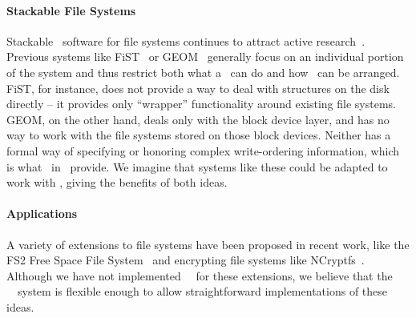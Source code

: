 
\paragraph{Stackable File Systems}


Stackable \module\ software for file systems continues to attract active
research~\cite{rosenthal90evolving, heidemann91layered, skinner93stacking,
heidemann94filesystem,zadok99extending,
zadok00fist,wright03ncryptfs,wright06versatility}. Previous
systems like FiST~\cite{zadok00fist} or GEOM~\cite{geom} generally focus on
an individual portion of the system and thus restrict both what a \module\
can do and how \modules\ can be arranged. FiST, for instance, does not
provide a way to deal with structures on the disk directly -- it provides
only ``wrapper'' functionality around existing file
systems. %
GEOM, on the other hand, deals only with the block device layer, and has no
way to work with the file systems stored on those block devices. Neither
has a formal way of specifying or honoring complex write-ordering
information, which is what \chdescs\ in \Kudos\ provide. We imagine that
systems like these could be adapted to work with \chdescs, giving the
benefits of both ideas.

\paragraph{Applications}

A variety of extensions to file systems have been proposed in recent work, like
the FS2 Free Space File System~\cite{huang05fs2} and encrypting file systems
like NCryptfs~\cite{wright03ncryptfs}. Although we have not implemented \Kudos\
\modules\ for these extensions, we believe that the \Kudos\ \module\ system is
flexible enough to allow straightforward implementations of these ideas.
\todo{Cite type-safe disks?}
